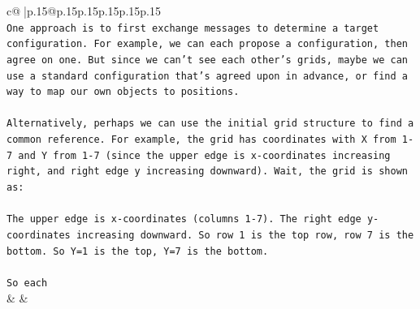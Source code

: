 \documentclass{article}
\begin{document}
{\begin{supertabular}{c@{$\;$}|p{.15\linewidth}@{}p{.15\linewidth}p{.15\linewidth}p{.15\linewidth}p{.15\linewidth}p{.15\linewidth}}
{{{\\ 
\texttt{One approach is to first exchange messages to determine a target configuration. For example, we can each propose a configuration, then agree on one. But since we can't see each other's grids, maybe we can use a standard configuration that's agreed upon in advance, or find a way to map our own objects to positions.} \\
\\ 
\texttt{Alternatively, perhaps we can use the initial grid structure to find a common reference. For example, the grid has coordinates with X from 1{-}7 and Y from 1{-}7 (since the upper edge is x{-}coordinates increasing right, and right edge y increasing downward). Wait, the grid is shown as:} \\
\\ 
\texttt{The upper edge is x{-}coordinates (columns 1{-}7). The right edge y{-}coordinates increasing downward. So row 1 is the top row, row 7 is the bottom. So Y=1 is the top, Y=7 is the bottom.} \\
\\ 
\texttt{So each} \\
            }
        }
    }
    & & \\ \\


\end{supertabular}}
\end{document}
